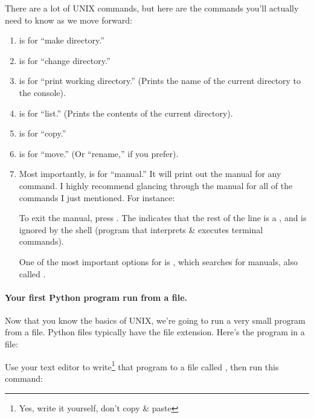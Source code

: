 
There are a lot of UNIX commands, but here are the commands you'll
actually need to know as we move forward:

\begin{enumerate}
\item {} is for ``make directory.''
\item {} is for ``change directory.''
\item {} is for ``print working directory.'' (Prints the name
  of the current directory to the console).
\item {} is for ``list.'' (Prints the contents of the current
  directory).
\item {} is for ``copy.''
\item {} is for ``move.'' (Or ``rename,'' if you prefer).
\item Most importantly,  is for ``manual.'' It will print
  out the manual for any command. I highly recommend glancing through
  the manual for all of the commands I just mentioned. For instance:


  To exit the manual, press . The \code{#} indicates that the
  rest of the line is a , and is ignored by the shell
  (program that interprets \& executes terminal commands).

  One of the most important options for  is ,
  which searches for manuals, also called .

\end{enumerate}

\paragraph{Your first Python program run from a file.}

Now that you know the basics of UNIX, we're going to run a very small
program from a file. Python files typically have the  file
extension. Here's the  program in a file:


Use your text editor to write\footnote{Yes, write it yourself, don't
  copy \& paste} that program to a file called ,
then run this command:


